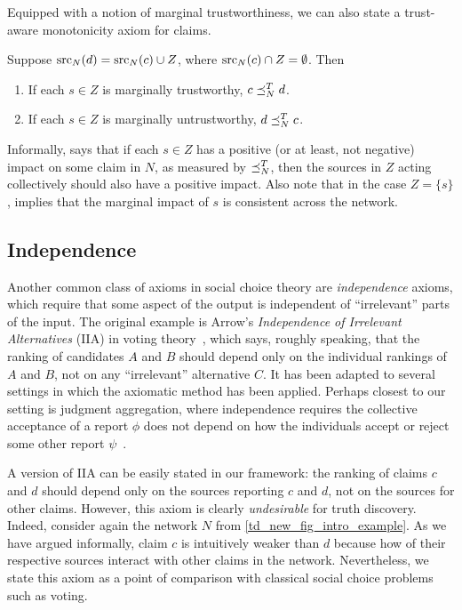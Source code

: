 Equipped with a notion of marginal trustworthiness, we can also state a
trust-aware monotonicity axiom for claims.

\begin{axiom}[\trustbasedmon{}]
    Suppose $\operatorname{src}_N(d) = \operatorname{src}_N(c) \cup Z$, where $\operatorname{src}_N(c) \cap Z =
    \emptyset$. Then
    \begin{enumerate}
        \item If each $s \in Z$ is marginally trustworthy, $c \preceq_N^T d$.
        \item If each $s \in Z$ is marginally untrustworthy, $d \preceq_N^T c$.
    \end{enumerate}
\end{axiom}

Informally, \trustbasedmon{} says that if each $s \in Z$ has a positive (or at
least, not negative) impact on some claim in $N$, as measured by $\preceq_N^T$,
then the sources in $Z$ acting collectively should also have a positive impact.
Also note that in the case $Z = \{s\}$, \trustbasedmon{} implies that the
marginal impact of $s$ is consistent across the network.


\subsection{Independence}
\label{td_new_sec_independence}

Another common class of axioms in social choice theory are \emph{independence}
axioms, which require that some aspect of the output is independent of
``irrelevant'' parts of the input. The original example is Arrow's
\emph{Independence of Irrelevant Alternatives} (IIA) in voting
theory~\cite{arrow1952}, which says, roughly speaking, that the ranking of
candidates $A$ and $B$ should depend only on the individual rankings of $A$ and
$B$, not on any ``irrelevant'' alternative $C$. It has been adapted to several
settings in which the axiomatic method has been applied. Perhaps closest to our
setting is judgment aggregation, where independence requires the collective
acceptance of a report $\phi$ does not depend on how the individuals accept or
reject some other report $\psi$~\cite{endriss2016ja}.

A version of IIA can be easily stated in our framework: the ranking of claims
$c$ and $d$ should depend only on the sources reporting $c$ and $d$, not on the
sources for other claims. However, this axiom is clearly \emph{undesirable} for
truth discovery. Indeed, consider again the network $N$ from
\cref{td_new_fig_intro_example}. As we have argued informally, claim $c$ is
intuitively weaker than $d$ because how of their respective sources interact
with other claims in the network. Nevertheless, we state this axiom as a point
of comparison with classical social choice problems such as voting.

